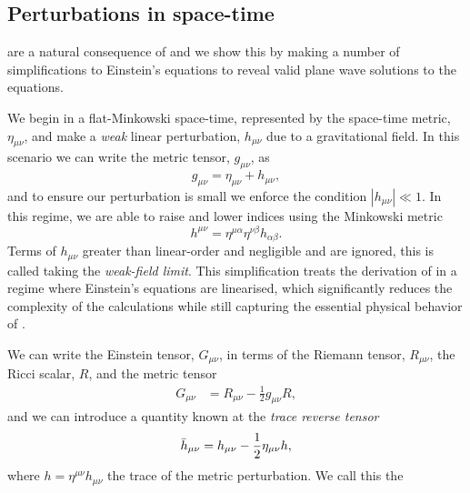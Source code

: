 \subsection{\label{1:sec:perturbations}Perturbations in space-time}

\Gws are a natural consequence of \GR and we show this by making a number of simplifications to Einstein's equations to reveal valid plane wave solutions to the equations.

We begin in a flat-Minkowski space-time, represented by the space-time metric, $\eta_{\mu\nu}$, and make a \textit{weak} linear perturbation, $h_{\mu\nu}$ due to a gravitational field. In this scenario we can write the metric tensor, $g_{\mu\nu}$, as
%
\begin{equation}
    g_{\mu\nu} = \eta_{\mu\nu} + h_{\mu\nu},
    \label{1:eq:metric_perturbation}
\end{equation}
%
and to ensure our perturbation is small we enforce the condition $|h_{\mu\nu}| \ll 1$. In this regime, we are able to raise and lower indices using the Minkowski metric
%
\begin{equation}
    h^{\mu\nu} = \eta^{\mu\alpha}\eta^{\nu\beta}h_{\alpha\beta}.
    \label{1:eq:raise_lowering_indices}
\end{equation}
%
Terms of $h_{\mu\nu}$ greater than linear-order and negligible and are ignored, this is called taking the \textit{weak-field limit}. This simplification treats the derivation of \gws in a regime where Einstein's equations are linearised, which significantly reduces the complexity of the calculations while still capturing the essential physical behavior of \gws.

We can write the Einstein tensor, $G_{\mu\nu}$, in terms of the Riemann tensor, $R_{\mu\nu}$, the Ricci scalar, $R$, and the metric tensor
%
\begin{align}
    G_{\mu\nu} &= R_{\mu\nu} - \frac{1}{2}g_{\mu\nu}R,
    \label{1:eq:g_munu_riemann}
\end{align}
%
and we can introduce a quantity known at the \textit{trace reverse tensor}
%
\begin{equation}
    \Bar{h}_{\mu\nu} = h_{\mu\nu} - \frac{1}{2} \eta_{\mu\nu}h,
\end{equation}
%
where $h = \eta^{\mu\nu}h_{\mu\nu}$ the trace of the metric perturbation. We call this the 


